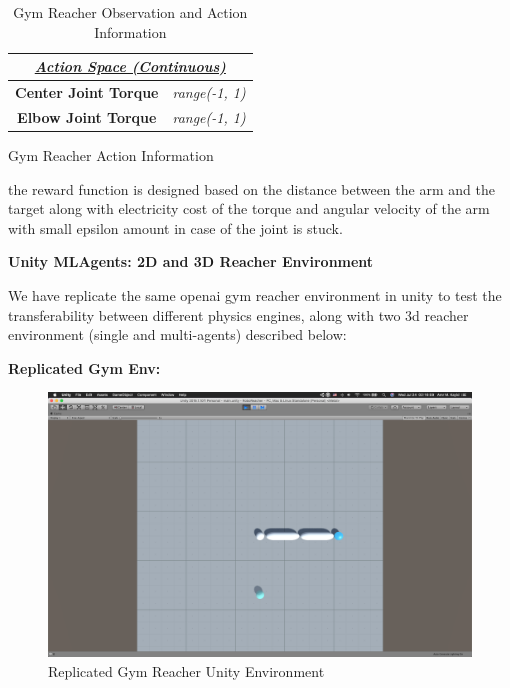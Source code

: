 \begin{table}[!htb]
\begin{subtable}{.4\linewidth}
        \centering
        \begin{tabular}{|c|c|}
            \hline
            \multicolumn{2}{|c|}{{\ul \textit{\textbf{Action Space (Continuous)}}}}                             \\ \hline
            \multirow{2}{*}{\textbf{Center Joint Torque}} & \multirow{2}{*}{\textit{range(-1, 1)}} \\
                                                          &                                        \\ \hline
            \multirow{2}{*}{\textbf{Elbow Joint Torque}}  & \multirow{2}{*}{\textit{range(-1, 1)}} \\
                                                          &                                        \\ \hline
            \end{tabular}
            \caption{Gym Reacher Action Information}
            \label{tab:gym_reacher_actions}
    \end{subtable}%
    \caption{Gym Reacher Observation and Action Information}
\end{table}

the reward function is designed based on the distance between the arm and the target along with electricity cost of the torque and angular velocity of the arm with small epsilon amount in case of the joint is stuck. 

\clearpage

\textbf{Unity MLAgents: 2D and 3D Reacher Environment}

We have replicate the same openai gym reacher environment in unity to test the transferability between different physics engines, along with two 3d reacher environment (single and multi-agents) described below:

\textbf{Replicated Gym Env:}

\begin{figure}[H]
    \begin{center}
            \includegraphics[width=0.7\linewidth]{figures/envs/unity_roboreacher.png}
            \caption{Replicated Gym Reacher Unity Environment}
            \label{fig:unity_reacher}
    \end{center}
\end{figure}


